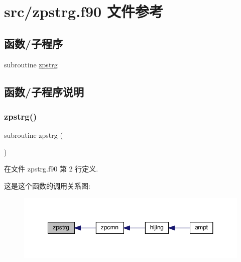 \hypertarget{zpstrg_8f90}{}\section{src/zpstrg.f90 文件参考}
\label{zpstrg_8f90}
\subsection*{函数/子程序}
\begin{DoxyCompactItemize}
\item 
subroutine \mbox{\hyperlink{zpstrg_8f90_a74d8f906cf67efa3e0dce2e56f7fe1c6}{zpstrg}}
\end{DoxyCompactItemize}


\subsection{函数/子程序说明}
\mbox{\label{zpstrg_8f90_a74d8f906cf67efa3e0dce2e56f7fe1c6}} 
\subsubsection{\texorpdfstring{zpstrg()}{zpstrg()}}
{\footnotesize\ttfamily subroutine zpstrg (\begin{DoxyParamCaption}{ }\end{DoxyParamCaption})}



在文件 zpstrg.\+f90 第 2 行定义.

这是这个函数的调用关系图\+:
\nopagebreak
\begin{figure}[H]
\begin{center}
\leavevmode
\includegraphics[width=350pt]{zpstrg_8f90_a74d8f906cf67efa3e0dce2e56f7fe1c6_icgraph}
\end{center}
\end{figure}
